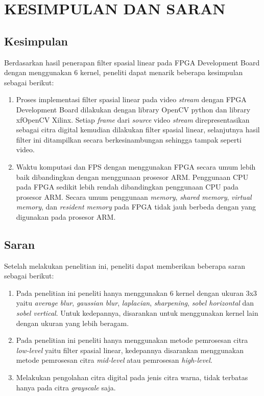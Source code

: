 
\chapter{KESIMPULAN DAN SARAN}

\section{Kesimpulan}
Berdasarkan hasil penerapan filter spasial linear pada FPGA Development Board dengan menggunakan 6 kernel, peneliti dapat menarik beberapa kesimpulan sebagai berikut:
\begin{enumerate}[topsep=0pt,itemsep=0pt,partopsep=0pt, parsep=0pt]
    \item Proses implementasi filter spasial linear pada video \textit{stream} dengan FPGA Development Board dilakukan dengan library OpenCV python dan library xfOpenCV Xilinx. Setiap \textit{frame} dari \textit{source} video \textit{stream} direpresentasikan sebagai citra digital kemudian dilakukan filter spasial linear, selanjutnya hasil filter ini ditampilkan secara berkesinambungan sehingga tampak seperti video.
    \item Waktu komputasi dan FPS dengan menggunakan FPGA secara umum lebih baik dibandingkan dengan menggunaan prosesor ARM. Penggunaan CPU pada FPGA sedikit lebih rendah dibandingkan penggunaan CPU pada prosesor ARM. Secara umum penggunaan \textit{memory}, \textit{shared memory}, \textit{virtual memory}, dan \textit{resident memory} pada FPGA tidak jauh berbeda dengan yang digunakan pada prosesor ARM.
\end{enumerate}


\section{Saran}
Setelah melakukan penelitian ini, peneliti dapat memberikan beberapa saran sebagai berikut:
\begin{enumerate}[topsep=0pt,itemsep=0pt,partopsep=0pt, parsep=0pt]
    \item Pada penelitian ini peneliti hanya menggunakan 6 kernel dengan ukuran 3x3 yaitu \textit{average blur}, \textit{gaussian blur}, \textit{laplacian}, \textit{sharpening}, \textit{sobel horizontal} dan \textit{sobel vertical}. Untuk kedepannya, disarankan untuk menggunakan kernel lain dengan ukuran yang lebih beragam.
    \item Pada penelitian ini peneliti hanya menggunakan metode pemrosesan citra \textit{low-level} yaitu filter spasial linear, kedepannya disarankan menggunakan metode pemrosesan citra \textit{mid-level} atau pemrosesan \textit{high-level}.
    \item Melakukan pengolahan citra digital pada jenis citra warna, tidak terbatas hanya pada citra \textit{grayscale} saja.
\end{enumerate}